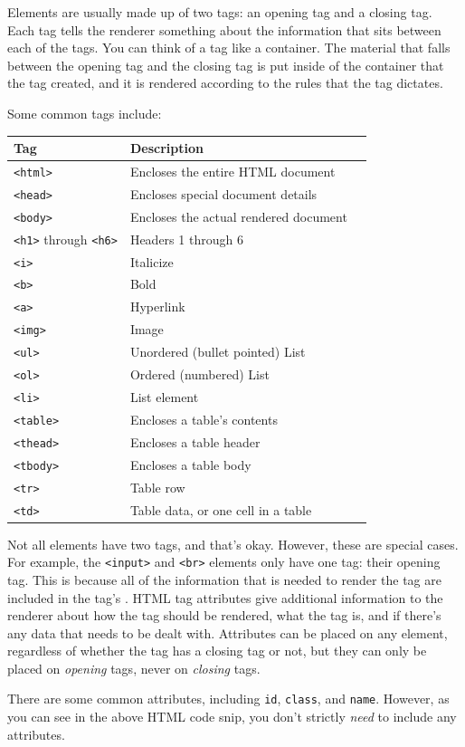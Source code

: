 Elements are usually made up of two tags: an opening tag and a closing tag. Each tag tells the renderer something about the information that sits between each of the tags. You can think of a tag like a container. The material that falls between the opening tag and the closing tag is put inside of the container that the tag created, and it is rendered according to the rules that the tag dictates.\par
Some common tags include:\par
\vspace{5mm}
\begin{tabular}{|l|l|l|}
\hline
Tag & Description              \\
\hline
\verb|<html>| & Encloses the entire HTML document \\
\hline
\verb|<head>| & Encloses special document details \\
\hline
\verb|<body>|  & Encloses the actual rendered document \\
\hline
\verb|<h1>| through \verb|<h6>| & Headers 1 through 6 \\
\hline
\verb|<i>| & Italicize \\
\hline
\verb|<b>| & Bold \\
\hline
\verb|<a>| & Hyperlink \\
\hline
\verb|<img>| & Image \\
\hline
\verb|<ul>| & Unordered (bullet pointed) List \\
\hline
\verb|<ol>| & Ordered (numbered) List \\
\hline
\verb|<li>| & List element \\
\hline
\verb|<table>| & Encloses a table's contents \\
\hline
\verb|<thead>| & Encloses a table header \\
\hline
\verb|<tbody>| & Encloses a table body \\
\hline
\verb|<tr>| & Table row \\
\hline
\verb|<td>| & Table data, or one cell in a table \\
\hline
\end{tabular}\par
\vspace{5mm}
Not all elements have two tags, and that's okay. However, these are special cases. For example, the \verb|<input>| and \verb|<br>| elements only have one tag: their opening tag. This is because all of the information that is needed to render the tag are included in the tag's . HTML tag attributes give additional information to the renderer about how the tag should be rendered, what the tag is, and if there's any data that needs to be dealt with. Attributes can be placed on any element, regardless of whether the tag has a closing tag or not, but they can only be placed on \textit{opening} tags, never on \textit{closing} tags.\par
There are some common attributes, including \verb|id|, \verb|class|, and \verb|name|. However, as you can see in the above HTML code snip, you don't strictly \textit{need} to include any attributes.

